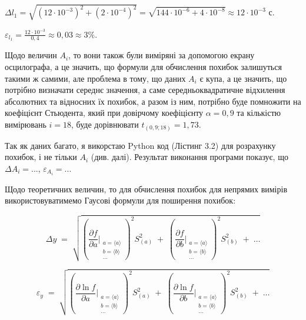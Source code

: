 \documentclass[12pt,a4paper]{article}
\begin{document}
    $\displaystyle \Delta l_1 = \sqrt{\left( 12 \cdot 10^{-3}\right)^2 + \left(2 \cdot 10^{-4}\right)^2} = \sqrt{144 \cdot 10^{-6} + 4 \cdot 10^{-8}} \approx 12 \cdot 10^{-3}$ с.

    $\displaystyle \varepsilon_{l_1} = \frac{12 \cdot 10^{-3}}{0,4} \approx 0,03 \approx 3\%$.

    \vspace{1em} %

    Щодо величин $A_i$, то вони також були виміряні за допомогою екрану осцилографа, а це значить, що формули для обчислення похибок залишуться такими ж самими, але проблема в тому, що
    даних $A_i$ є купа, а це значить, що потрібно визначати середнє значення, а саме середньоквадратичне відхилення абсолютних та відносних їх похибок, а разом із ним, потрібно буде помножити на коефіцієнт
    Стьюдента, який при довірчому коефіцієнту $\alpha = 0,9$ та кількістю вимірювань $i = 18$, буде дорівнювати $t_{(0,9; 18)} = 1,73$.

    Так як даних багато, я викорстаю Python код (Лістинг 3.2) для розрахунку похибок, і не тільки $A_i$ (див. далі). Результат виконання програми показує, що $\Delta A_i = ...$, $\varepsilon_{A_i} = ...$

    Щодо теоретичних величин, то для обчислення похибок для непрямих вимірів використовуватимемо Гаусові формули для поширення похибок:

    \[
        \Delta y \;=\;
        \sqrt{
        \left(
            \frac{\partial f}{\partial a}\Bigg|_{\substack{a=\langle a\rangle \\ b=\langle b\rangle \\ \dots}}
        \right)^{2} S_{(a)}^{2}
        \;+\;
        \left(
            \frac{\partial f}{\partial b}\Bigg|_{\substack{a=\langle a\rangle \\ b=\langle b\rangle \\ \dots}}
        \right)^{2} S_{(b)}^{2}
        \;+\;\dots
        }
    \]

    \[
        \varepsilon_y \;=\;
        \sqrt{
        \left(
            \frac{\partial \ln f}{\partial a}\Bigg|_{\substack{a=\langle a\rangle \\ b=\langle b\rangle \\ \dots}}
        \right)^{2} S_{(a)}^{2}
        \;+\;
        \left(
            \frac{\partial \ln f}{\partial b}\Bigg|_{\substack{a=\langle a\rangle \\ b=\langle b\rangle \\ \dots}}
        \right)^{2} S_{(b)}^{2}
        \;+\;\dots
        }
    \]
\end{document}
